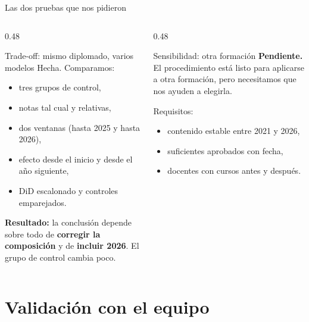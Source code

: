 \documentclass[10pt,aspectratio=169]{beamer}
\begin{document}
\begin{frame}{Las dos pruebas que nos pidieron}
  \begin{columns}[T]
    \begin{column}{0.48\textwidth}
      \begin{block}{Trade-off: mismo diplomado, varios modelos}
        \small Hecha. Comparamos:
        \begin{itemize}\small
          \item tres grupos de control,
          \item notas tal cual y relativas,
          \item dos ventanas (hasta 2025 y hasta 2026),
          \item efecto desde el inicio y desde el año siguiente,
          \item DiD escalonado y controles emparejados.
        \end{itemize}
        \small \textbf{Resultado:} la conclusión depende sobre todo de \textbf{corregir la composición} y de \textbf{incluir 2026}. El grupo de control cambia poco.
      \end{block}
    \end{column}
    \begin{column}{0.48\textwidth}
      \begin{alertblock}{Sensibilidad: otra formación}
        \small \textbf{Pendiente.} El procedimiento está listo para aplicarse a otra formación, pero necesitamos que nos ayuden a elegirla.
        \vspace{0.3em}

        \small Requisitos:
        \begin{itemize}\small
          \item contenido estable entre 2021 y 2026,
          \item suficientes aprobados con fecha,
          \item docentes con cursos antes y después.
        \end{itemize}
      \end{alertblock}
    \end{column}
  \end{columns}
\end{frame}

\section{Validación con el equipo}
\end{document}
